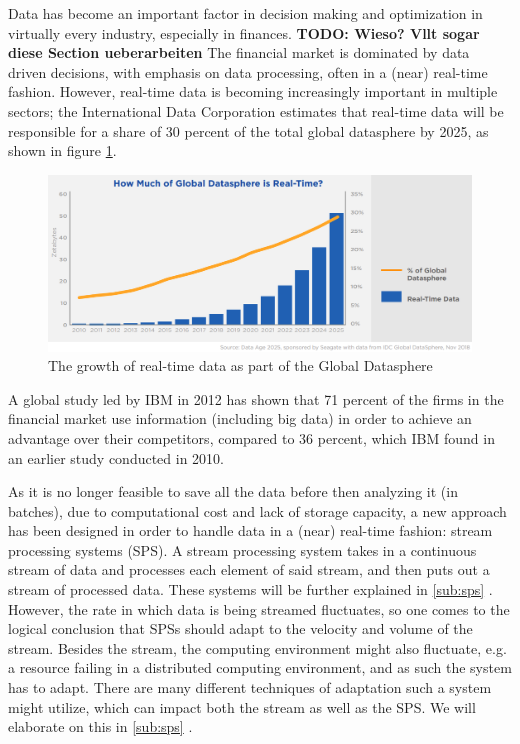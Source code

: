 \quad Data has become an important factor in decision making and optimization in virtually every industry, especially in finances. \textbf{TODO: Wieso? Vllt sogar diese Section ueberarbeiten}
The financial market is dominated by data driven decisions, with emphasis on data processing, often in a (near) real-time fashion.
However, real-time data is becoming increasingly important in multiple sectors; the International Data Corporation estimates that real-time data will be 
responsible for a share of 30 percent of the total global datasphere by 2025, as shown in figure \ref{fig:growth_realtime_data}.
\begin{figure}[ht]
\centering
\includegraphics[width=1.0\textwidth]{Bilder/realtime_data.png}
\caption{The growth of real-time data as part of the Global Datasphere \cite[p. 13]{idc-seagate-data}}
\label{fig:growth_realtime_data}
\end{figure}

\quad A global study led by IBM in 2012 has shown that 71 percent of the firms in the financial market use information (including big data)
in order to achieve an advantage over their competitors, compared to 36 percent, which IBM found in an earlier study conducted in 2010. \cite[p. 1]{ibm-financial}

\quad As it is no longer feasible to save all the data before then analyzing it (in batches), due to computational cost and lack of storage capacity, 
a new approach has been designed in order to handle data in a (near) real-time fashion: stream processing systems (SPS). 
A stream processing system takes in a continuous stream of data and processes each element of said stream, and then puts out a stream of processed data.
These systems will be further explained in \ref{sub:sps} .
\quad However, the rate in which data is being streamed fluctuates, so one comes to the logical conclusion that SPSs should adapt to the velocity and volume of the stream.
Besides the stream, the computing environment might also fluctuate, e.g. a resource failing in a distributed computing environment, 
and as such the system has to adapt. There are many different techniques of adaptation such a system might utilize, 
which can impact both the stream as well as the SPS. We will elaborate on this in \ref{sub:sps} .

